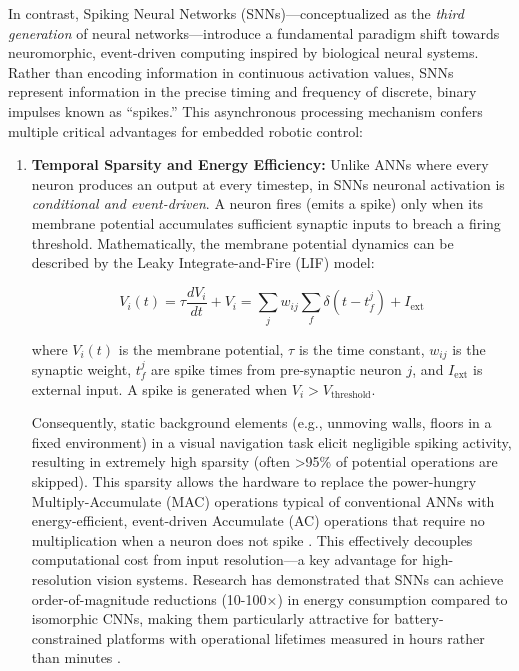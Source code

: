 


In contrast, Spiking Neural Networks (SNNs)—conceptualized as the \emph{third generation} of neural 
networks—introduce a fundamental paradigm shift towards neuromorphic, event-driven computing inspired 
by biological neural systems. Rather than encoding information in continuous activation values, SNNs 
represent information in the precise timing and frequency of discrete, binary impulses known as ``spikes.'' 
This asynchronous processing mechanism confers multiple critical advantages for embedded robotic control:

\begin{enumerate}
    
\item \textbf{Temporal Sparsity and Energy Efficiency:}
Unlike ANNs where every neuron produces an output at every timestep, in SNNs neuronal activation is 
\emph{conditional and event-driven}. A neuron fires (emits a spike) only when its membrane potential 
accumulates sufficient synaptic inputs to breach a firing threshold. Mathematically, the membrane 
potential dynamics can be described by the Leaky Integrate-and-Fire (LIF) model:

$$V_i(t) = \tau \frac{dV_i}{dt} + V_i = \sum_j w_{ij} \sum_f \delta(t - t_f^j) + I_{\text{ext}}$$

where $V_i(t)$ is the membrane potential, $\tau$ is the time constant, $w_{ij}$ is the synaptic weight, 
$t_f^j$ are spike times from pre-synaptic neuron $j$, and $I_{\text{ext}}$ is external input. A spike 
is generated when $V_i > V_{\text{threshold}}$.

Consequently, static background elements (e.g., unmoving walls, floors in a fixed environment) in a 
visual navigation task elicit negligible spiking activity, resulting in extremely high sparsity (often 
>95\% of potential operations are skipped). This sparsity allows the hardware to replace the power-hungry 
Multiply-Accumulate (MAC) operations typical of conventional ANNs with energy-efficient, event-driven 
Accumulate (AC) operations that require no multiplication when a neuron does not spike \cite{roy2019towards}. 
This effectively decouples computational cost from input resolution—a key advantage for high-resolution 
vision systems. Research has demonstrated that SNNs can achieve order-of-magnitude reductions (10-100×) 
in energy consumption compared to isomorphic CNNs, making them particularly attractive for battery-constrained 
platforms with operational lifetimes measured in hours rather than minutes \cite{pham2019spiking}.



\end{enumerate}
